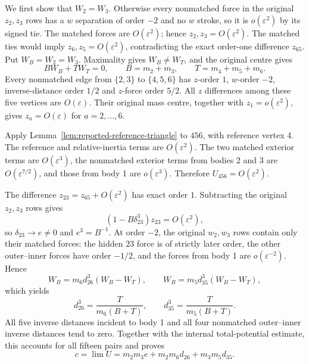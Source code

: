 \documentclass[11pt]{amsart}
\theoremstyle{remark}
\begin{document}
We first show that $W_2=W_3$. Otherwise every nonmatched force in the original $z_2,z_3$ rows has a $w$ separation of order $-2$ and no $w$ stroke, so it is $o(\varepsilon^2)$ by its signed tie. The matched forces are $O(\varepsilon^2)$; hence $z_2,z_3=O(\varepsilon^2)$. The matched ties would imply $z_6,z_5=O(\varepsilon^2)$, contradicting the exact order-one difference $z_{65}$. Put $W_B=W_2=W_3$. Maximality gives $W_B\ne W_T$, and the original centre gives
\[
 BW_B+TW_T=0,\qquad
 B=m_2+m_3,\qquad T=m_4+m_5+m_6.
\]
Every nonmatched edge from $\{2,3\}$ to $\{4,5,6\}$ has $z$-order $1$, $w$-order $-2$, inverse-distance order $1/2$ and $z$-force order $5/2$. All $z$ differences among these five vertices are $O(\varepsilon)$. Their original mass centre, together with $z_1=o(\varepsilon^2)$, gives $z_a=O(\varepsilon)$ for $a=2,\ldots,6$.

Apply Lemma~\ref{lem:reported-reference-triangle} to $456$, with reference vertex 4. The reference and relative-inertia terms are $O(\varepsilon^2)$. The two matched exterior terms are $O(\varepsilon^3)$, the nonmatched exterior terms from bodies 2 and 3 are $O(\varepsilon^{7/2})$, and those from body 1 are $o(\varepsilon^3)$. Therefore $U_{456}=O(\varepsilon^2)$.

The difference $z_{23}=z_{65}+O(\varepsilon^2)$ has exact order $1$. Subtracting the original $z_2,z_3$ rows gives
\[
 (1-B\delta_{23}^3)z_{23}=O(\varepsilon^2),
\]
so $\delta_{23}\to e\ne0$ and $e^3=B^{-1}$. At order $-2$, the original $w_2,w_3$ rows contain only their matched forces: the hidden $23$ force is of strictly later order, the other outer--inner forces have order $-1/2$, and the forces from body 1 are $o(\varepsilon^{-2})$. Hence
\[
 W_B=m_6d_{26}^3(W_B-W_T),\qquad
 W_B=m_5d_{35}^3(W_B-W_T),
\]
which yields
\[
 d_{26}^3=\frac{T}{m_6(B+T)},\qquad
 d_{35}^3=\frac{T}{m_5(B+T)}.
\]
All five inverse distances incident to body 1 and all four nonmatched outer--inner inverse distances tend to zero. Together with the internal total-potential estimate, this accounts for all fifteen pairs and proves
\[
 c=\lim U=m_2m_3e+m_2m_6d_{26}+m_3m_5d_{35}.
\]
\end{document}
